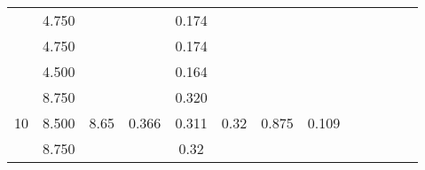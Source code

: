 \documentclass[a4paper,12pt]{article}
\begin{document}
\begin{table}[htp]
\begin{tabular}{|c|c|c|c|c|c|c|c|c|c|c|c|c|}
                       & 4.750                   &                                       &                        & 0.174 &                        &                        &                        &                                                            &                                                            &                        &                         &                        \\ \cline{2-2} \cline{5-5}
                       & 4.750                   &                                       &                        & 0.174 &                        &                        &                        &                                                            &                                                            &                        &                         &                        \\ \cline{2-2} \cline{5-5}
                       & 4.500                   &                                       &                        & 0.164 &                        &                        &                        &                                                            &                                                            &                        &                         &                        \\ \cline{1-8}
\multirow{5}{*}{10}    & 8.750                   & \multirow{5}{*}{8.65}                 & \multirow{5}{*}{0.366} & 0.320 & \multirow{5}{*}{0.32}  & \multirow{5}{*}{0.875} & \multirow{5}{*}{0.109} &                                                            &                                                            &                        &                         &                        \\ \cline{2-2} \cline{5-5}
                       & 8.500                   &                                       &                        & 0.311 &                        &                        &                        &                                                            &                                                            &                        &                         &                        \\ \cline{2-2} \cline{5-5}
                       & 8.750                   &                                       &                        & 0.32  &                        &                        &                        &                                                            &                                                            &                        &                         &                        \\ \cline{2-2} \cline{5-5}

\end{tabular}
\end{table}
\end{document}
